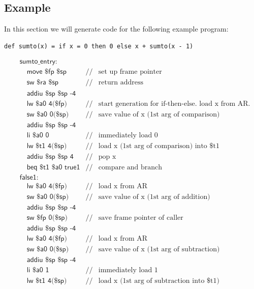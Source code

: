 \subsection{Example}
In this section we will generate code for the following example program:
\begin{lstlisting}
def sumto(x) = if x = 0 then 0 else x + sumto(x - 1)
\end{lstlisting}
\begin{align*}
&\textsf{sumto\_entry:}&&\\
&\quad\textsf{move \$fp \$sp}&//&\text{set up frame pointer}\\
&\quad\textsf{sw \$ra \$sp}&//&\text{return address}\\
&\quad\textsf{addiu \$sp \$sp -4}&&\\
&\quad\textsf{lw \$a0 4(\$fp)}&//&\text{start generation for if-then-else. load x from AR.}\\
&\quad\textsf{sw \$a0 0(\$sp)}&//&\text{save value of x (1st arg of comparison)}\\
&\quad\textsf{addiu \$sp \$sp -4}&&\\
&\quad\textsf{li \$a0 0}&//&\text{immediately load 0}\\
&\quad\textsf{lw \$t1 4(\$sp)}&//&\text{load x (1st arg of comparison) into \$t1}\\
&\quad\textsf{addiu \$sp \$sp 4}&//&\text{pop x}\\
&\quad\textsf{beq \$t1 \$a0 true1}&//&\text{compare and branch}\\
&\textsf{false1:}&&\\
&\quad\textsf{lw \$a0 4(\$fp)}&//&\text{load x from AR}\\
&\quad\textsf{sw \$a0 0(\$sp)}&//&\text{save value of x (1st arg of addition)}\\
&\quad\textsf{addiu \$sp \$sp -4}&&\\
&\quad\textsf{sw \$fp 0(\$sp)}&//&\text{save frame pointer of caller}\\
&\quad\textsf{addiu \$sp \$sp -4}&&\\
&\quad\textsf{lw \$a0 4(\$fp)}&//&\text{load x from AR}\\
&\quad\textsf{sw \$a0 0(\$sp)}&//&\text{save value of x (1st arg of subtraction)}\\
&\quad\textsf{addiu \$sp \$sp -4}&&\\
&\quad\textsf{li \$a0 1}&//&\text{immediately load 1}\\
&\quad\textsf{lw \$t1 4(\$sp)}&//&\text{load x (1st arg of subtraction into \$t1)}\\

\end{align*}
